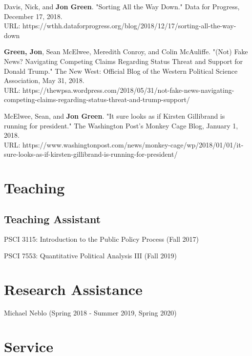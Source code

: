 \documentclass[letterpaper]{article}
\renewenvironment{itemize}{
  \begin{list}{}{
    \setlength{\leftmargin}{1.5em}
  }
}{
  \end{list}
}
\begin{document}
\begin{itemize}
\item Davis, Nick, and \textbf{Jon Green}. "Sorting All the Way Down." Data for Progress, December 17, 2018. \\
URL: https://wthh.dataforprogress.org/blog/2018/12/17/sorting-all-the-way-down

\item \textbf{Green, Jon}, Sean McElwee, Meredith Conroy, and Colin McAuliffe. "(Not) Fake News? Navigating Competing Claims Regarding Status Threat and Support for Donald Trump." The New West: Official Blog of the Western Political Science Association, May 31, 2018. \\
URL: https://thewpsa.wordpress.com/2018/05/31/not-fake-news-navigating-competing-claims-regarding-status-threat-and-trump-support/

\item McElwee, Sean, and \textbf{Jon Green}. "It sure looks as if Kirsten Gillibrand is running for president." The Washington Post's Monkey Cage Blog, January 1, 2018. \\ 
URL: https://www.washingtonpost.com/news/monkey-cage/wp/2018/01/01/it-sure-looks-as-if-kirsten-gillibrand-is-running-for-president/
\end{itemize}

\section*{Teaching}

\subsection*{Teaching Assistant}

\begin{itemize}
\item PSCI 3115: Introduction to the Public Policy Process (Fall 2017)
\item PSCI 7553: Quantitative Political Analysis III (Fall 2019) 
\end{itemize}

\section*{Research Assistance}
\begin{itemize}
\item  Michael Neblo (Spring 2018 - Summer 2019, Spring 2020)
\end{itemize}

\section*{Service}
\end{document}
